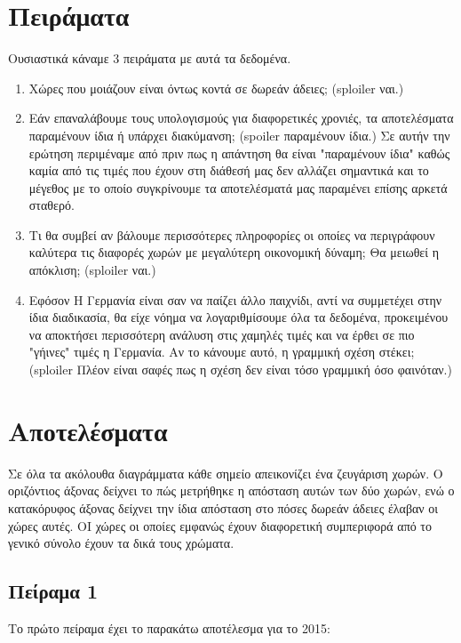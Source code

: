 \documentclass[a4paper,twoside,10pt]{article}
\begin{document}
	\section{Πειράματα}
	Ουσιαστικά κάναμε 3 πειράματα με αυτά τα δεδομένα. 
	\begin{enumerate}
		\item Χώρες που μοιάζουν είναι όντως κοντά σε δωρεάν άδειες; (sploiler ναι.)
		\item Εάν επαναλάβουμε τους υπολογισμούς για διαφορετικές χρονιές, τα αποτελέσματα παραμένουν ίδια ή υπάρχει διακύμανση; (spoiler παραμένουν ίδια.)    Σε αυτήν την ερώτηση περιμέναμε από πριν πως η απάντηση θα είναι "παραμένουν ίδια" καθώς καμία από τις τιμές που έχουν στη διάθεσή μας δεν αλλάζει σημαντικά και το μέγεθος με το οποίο συγκρίνουμε τα αποτελέσματά μας παραμένει επίσης αρκετά σταθερό.
		\item Τι θα  συμβεί αν βάλουμε περισσότερες πληροφορίες οι οποίες να περιγράφουν καλύτερα τις διαφορές χωρών με μεγαλύτερη οικονομική δύναμη; Θα μειωθεί η απόκλιση; (sploiler ναι.)
		\item Εφόσον Η Γερμανία είναι σαν να παίζει άλλο παιχνίδι, αντί να συμμετέχει στην ίδια διαδικασία, θα είχε νόημα να λογαριθμίσουμε όλα τα δεδομένα, προκειμένου να αποκτήσει περισσότερη ανάλυση στις χαμηλές τιμές και να έρθει σε πιο "γήινες" τιμές η Γερμανία. Αν το κάνουμε αυτό, η γραμμική σχέση στέκει; (sploiler Πλέον είναι σαφές πως η σχέση δεν είναι τόσο γραμμική όσο φαινόταν.)
	\end{enumerate}
	
	\section{Αποτελέσματα}
	Σε όλα τα ακόλουθα διαγράμματα κάθε σημείο απεικονίζει ένα ζευγάριση χωρών. Ο οριζόντιος άξονας δείχνει το πώς μετρήθηκε η απόσταση αυτών των δύο χωρών, ενώ ο κατακόρυφος άξονας δείχνει την ίδια απόσταση στο πόσες δωρεάν άδειες έλαβαν οι χώρες αυτές. ΟΙ χώρες οι οποίες εμφανώς έχουν διαφορετική συμπεριφορά από το γενικό σύνολο έχουν τα δικά τους χρώματα.
	
	\subsection{Πείραμα 1}
	Το πρώτο πείραμα έχει το παρακάτω αποτέλεσμα για το 2015:
	
\end{document}
